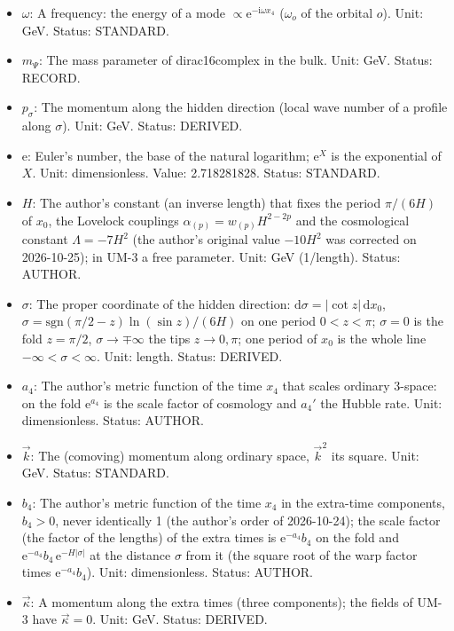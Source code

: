 \documentclass[
  10pt,
]{article}
\providecommand{\tightlist}{%
  \setlength{\itemsep}{0pt}\setlength{\parskip}{0pt}}
\begin{document}
\begin{itemize}
\tightlist
\item
  \(\omega\): A frequency: the energy of a mode
  \(\propto \mathrm{e}^{-\mathrm{i}\omega x_4}\) (\(\omega_o\) of the
  orbital \(o\)). Unit: GeV. Status: STANDARD.
\item
  \(m_\Psi\): The mass parameter of dirac16complex in the bulk. Unit:
  GeV. Status: RECORD.
\item
  \(p_\sigma\): The momentum along the hidden direction (local wave
  number of a profile along \(\sigma\)). Unit: GeV. Status: DERIVED.
\item
  \(\mathrm{e}\): Euler's number, the base of the natural logarithm;
  \(\mathrm{e}^{X}\) is the exponential of \(X\). Unit: dimensionless.
  Value: 2.718281828. Status: STANDARD.
\item
  \(H\): The author's constant (an inverse length) that fixes the period
  \(\pi/(6H)\) of \(x_0\), the Lovelock couplings
  \(\alpha_{(p)} = w_{(p)}H^{2-2p}\) and the cosmological constant
  \(\Lambda = -7H^2\) (the author's original value \(-10H^2\) was
  corrected on 2026-10-25); in UM-3 a free parameter. Unit: GeV
  (1/length). Status: AUTHOR.
\item
  \(\sigma\): The proper coordinate of the hidden direction:
  \(\mathrm{d}\sigma = \lvert\cot z\rvert\,\mathrm{d}x_0\),
  \(\sigma = \mathrm{sgn}(\pi/2 - z)\ln(\sin z)/(6H)\) on one period
  \(0 < z < \pi\); \(\sigma = 0\) is the fold \(z = \pi/2\),
  \(\sigma \to \mp\infty\) the tips \(z \to 0, \pi\); one period of
  \(x_0\) is the whole line \(-\infty < \sigma < \infty\). Unit: length.
  Status: DERIVED.
\item
  \(a_4\): The author's metric function of the time \(x_4\) that scales
  ordinary 3-space: on the fold \(\mathrm{e}^{a_4}\) is the scale factor
  of cosmology and \(a_4'\) the Hubble rate. Unit: dimensionless.
  Status: AUTHOR.
\item
  \(\vec k\): The (comoving) momentum along ordinary space, \(\vec k^2\)
  its square. Unit: GeV. Status: STANDARD.
\item
  \(b_4\): The author's metric function of the time \(x_4\) in the
  extra-time components, \(b_4 > 0\), never identically 1 (the author's
  order of 2026-10-24); the scale factor (the factor of the lengths) of
  the extra times is \(\mathrm{e}^{-a_4}b_4\) on the fold and
  \(\mathrm{e}^{-a_4}b_4\,\mathrm{e}^{-H\lvert\sigma\rvert}\) at the
  distance \(\sigma\) from it (the square root of the warp factor times
  \(\mathrm{e}^{-a_4}b_4\)). Unit: dimensionless. Status: AUTHOR.
\item
  \(\vec\kappa\): A momentum along the extra times (three components);
  the fields of UM-3 have \(\vec\kappa = 0\). Unit: GeV. Status:
  DERIVED.
\end{itemize}
\end{document}
